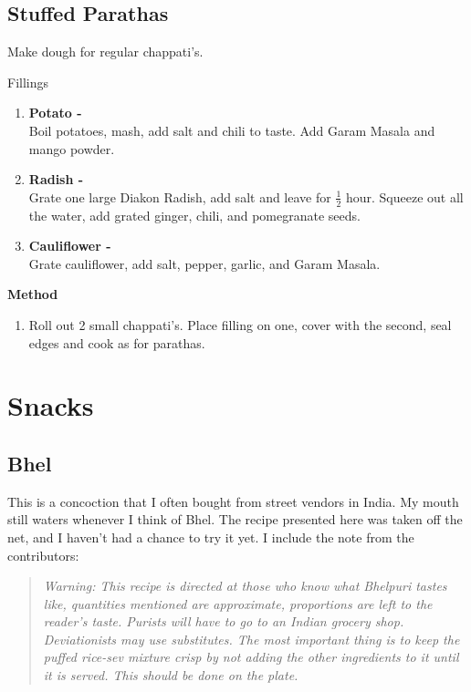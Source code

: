 \section{Stuffed Parathas}

Make dough for regular chappati's.

Fillings
\begin{enumerate}
\item {\bf Potato - }\\ Boil potatoes, mash, add salt and chili to taste. Add Garam Masala and
mango powder.

\item {\bf Radish - }\\ Grate one large Diakon Radish, add salt and leave for $\frac{1}{2}$ hour.  Squeeze
out  all the water, add grated ginger, chili, and pomegranate seeds.

\item {\bf Cauliflower - }\\Grate cauliflower, add salt, pepper, garlic, and Garam Masala.
\end{enumerate}

{\bf Method}
\begin{enumerate}
\item  Roll out 2 small chappati's. Place filling on one, cover with the second,
seal edges and cook as for parathas.
\end{enumerate}

\chapter{Snacks}

\section{Bhel}

  This  is  a  concoction that I often bought from street vendors in India.  My
mouth still waters whenever I think of Bhel.  The  recipe  presented  here  was
taken off the net, and I haven't had a chance to try it yet.  I
include the note from the contributors:

\begin{quote}
    {\em Warning: This recipe is directed at those  who  know  what  Bhelpuri
    tastes  like, quantities mentioned are approximate, proportions are left to
    the reader's taste. Purists will  have  to  go  to  an  Indian
    grocery  shop.  Deviationists  may  use substitutes. The most important
    thing is to keep the puffed rice-sev mixture crisp by  not  adding  the
    other ingredients to it until it is served.  This should be done on the plate.}
\end{quote}


